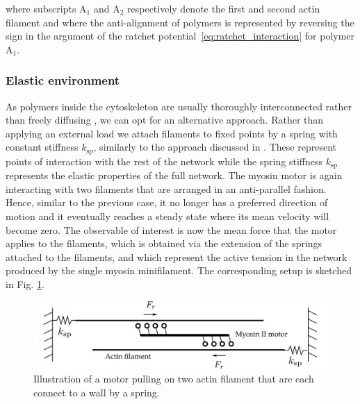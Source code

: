 \documentclass[aps,pre,twocolumn,showpacs,showkeys,superscriptaddress,floatfix]{revtex4-1}
\begin{document}
where subscripts ${\text{A}_1}$ and ${\text{A}_2}$ respectively denote the first and second actin filament 
and where the anti-alignment of polymers is represented by reversing the sign in the argument of the ratchet potential~\eqref{eq:ratchet_interaction} for polymer $\text{A}_1$.


\subsubsection{Elastic environment}
\label{sec:environment}
As polymers inside the cytoskeleton are usually thoroughly interconnected rather than freely diffusing \cite{blanchoin2014actin,ennomani2016architecture},
we can opt for an alternative approach.
Rather than applying an external load we attach filaments to fixed points by a spring with constant stiffness $k_\text{sp}$, 
similarly to the approach discussed in \cite{Albert2014}. 
These represent points of interaction with the rest of the network while the spring stiffness $k_\text{sp}$ represents the elastic properties of the full network. 
The myosin motor is again interacting with two filaments that are arranged in an anti-parallel fashion. 
Hence, similar to the previous case, it no longer has a preferred direction of motion 
and it eventually reaches a steady state where its mean velocity will become zero. 
The observable of interest is now the mean force that the motor applies to the filaments, 
which is obtained via the extension of the springs attached to the filaments,
and which represent the active tension in the network produced by the single myosin minifilament. 
The corresponding setup is sketched in Fig. \ref{fig:tug}. 
\begin{figure}[t]
\centering
\includegraphics[width=0.9\linewidth,height=!]{tug}
\caption{
\label{fig:tug}
Illustration of a motor pulling on two actin filament that are each connect to a wall by a spring.
}
\end{figure}
\end{document}
